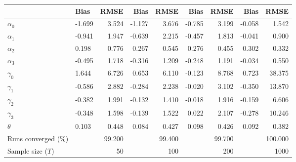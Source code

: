 
\begin{tabular}[t]{llrrrrrrr}
\toprule
  & Bias & RMSE & Bias & RMSE & Bias & RMSE & Bias & RMSE\\
\midrule
$\alpha_{0}$ & -1.699 & 3.524 & -1.127 & 3.676 & -0.785 & 3.199 & -0.058 & 1.542\\
$\alpha_{1}$ & -0.941 & 1.947 & -0.639 & 2.215 & -0.457 & 1.813 & -0.041 & 0.900\\
$\alpha_{2}$ & 0.198 & 0.776 & 0.267 & 0.545 & 0.276 & 0.455 & 0.302 & 0.332\\
$\alpha_{3}$ & -0.495 & 1.718 & -0.316 & 1.209 & -0.248 & 1.191 & -0.034 & 0.550\\
$\gamma_{0}$ & 1.644 & 6.726 & 0.653 & 6.110 & -0.123 & 8.768 & 0.723 & 38.375\\
$\gamma_{1}$ & -0.586 & 2.882 & -0.284 & 2.238 & -0.020 & 3.102 & -0.350 & 13.870\\
$\gamma_{2}$ & -0.382 & 1.991 & -0.132 & 1.410 & -0.018 & 1.916 & -0.159 & 6.606\\
$\gamma_{3}$ & -0.348 & 1.598 & -0.139 & 1.522 & 0.022 & 2.107 & -0.278 & 10.246\\
$\theta$ & 0.103 & 0.448 & 0.084 & 0.427 & 0.098 & 0.426 & 0.092 & 0.382\\
Runs converged (\%) &  & 99.200 &  & 99.400 &  & 99.700 &  & 100.000\\
Sample size ($T$) &  & 50 &  & 100 &  & 200 &  & 1000\\
\bottomrule
\end{tabular}
